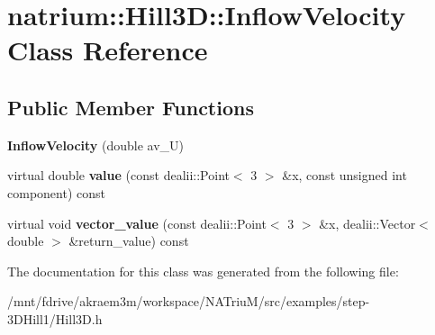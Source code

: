 \hypertarget{classnatrium_1_1Hill3D_1_1InflowVelocity}{
\section{natrium::Hill3D::InflowVelocity Class Reference}
\label{classnatrium_1_1Hill3D_1_1InflowVelocity}
}
\subsection*{Public Member Functions}
\begin{DoxyCompactItemize}
\item 
\hypertarget{classnatrium_1_1Hill3D_1_1InflowVelocity_ae48b738880d1d0748c462b6247aa134e}{
{\bfseries InflowVelocity} (double av\_\-U)}
\label{classnatrium_1_1Hill3D_1_1InflowVelocity_ae48b738880d1d0748c462b6247aa134e}

\item 
\hypertarget{classnatrium_1_1Hill3D_1_1InflowVelocity_a7df8a946d9414622b2e690754b365aaa}{
virtual double {\bfseries value} (const dealii::Point$<$ 3 $>$ \&x, const unsigned int component) const }
\label{classnatrium_1_1Hill3D_1_1InflowVelocity_a7df8a946d9414622b2e690754b365aaa}

\item 
\hypertarget{classnatrium_1_1Hill3D_1_1InflowVelocity_a0cc87c18b9d94927181bd6af65dd8a73}{
virtual void {\bfseries vector\_\-value} (const dealii::Point$<$ 3 $>$ \&x, dealii::Vector$<$ double $>$ \&return\_\-value) const }
\label{classnatrium_1_1Hill3D_1_1InflowVelocity_a0cc87c18b9d94927181bd6af65dd8a73}

\end{DoxyCompactItemize}


The documentation for this class was generated from the following file:\begin{DoxyCompactItemize}
\item 
/mnt/fdrive/akraem3m/workspace/NATriuM/src/examples/step-\/3DHill1/Hill3D.h\end{DoxyCompactItemize}
